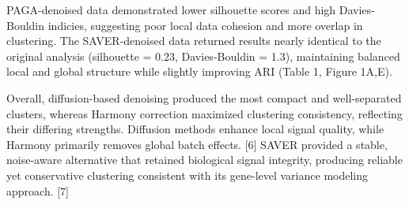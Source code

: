 \documentclass[11pt]{article}
\begin{document}
PAGA-denoised data demonstrated lower silhouette scores and high Davies-Bouldin indicies, suggesting poor local data cohesion and more overlap in clustering. The SAVER-denoised data returned results nearly identical to the original analysis (silhouette = 0.23, Davies-Bouldin = 1.3), maintaining balanced local and global structure while slightly improving ARI (Table 1, Figure 1A,E).

Overall, diffusion-based denoising produced the most compact and well-separated clusters, whereas Harmony correction maximized clustering consistency, reflecting their differing strengths. Diffusion methods enhance local signal quality, while Harmony primarily removes global batch effects. [6] SAVER provided a stable, noise-aware alternative that retained biological signal integrity, producing reliable yet conservative clustering consistent with its gene-level variance modeling approach. [7]

\begin{table}[h]
    \centering
    \caption{Comparison of clustering performance metrics across preprocessing and correction methods.}
    \label{tab:clustering_comparison}
\end{table}
\end{document}
